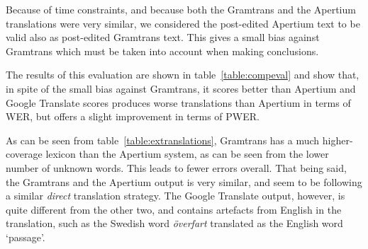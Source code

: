 \documentclass[11pt]{article}
\begin{document}
Because of time constraints, and because both the Gramtrans and the Apertium translations were very similar, 
we considered the post-edited Apertium text to be valid also as post-edited Gramtrans text.
This gives a small bias against Gramtrans which must be taken into account when making 
conclusions.

The results of this evaluation are shown in table~\ref{table:compeval} and show that, in spite 
of the small bias against Gramtrans, it scores better than Apertium and Google Translate 
scores produces worse translations than Apertium in terms of WER, but offers a slight improvement
in terms of PWER. 

As can be seen from table~\ref{table:extranslations}, Gramtrans has a much higher-coverage lexicon 
than the Apertium system, as can be seen from the lower number of unknown words. This leads to fewer errors overall. That being said, the Gramtrans
and the Apertium output is very similar, and seem to be following a similar \emph{direct} translation 
strategy. The Google Translate output, however, is quite different from the other two, and contains 
artefacts from English in the translation, such as the Swedish word \emph{överfart} translated as 
the English word `passage'. 




\end{document}
